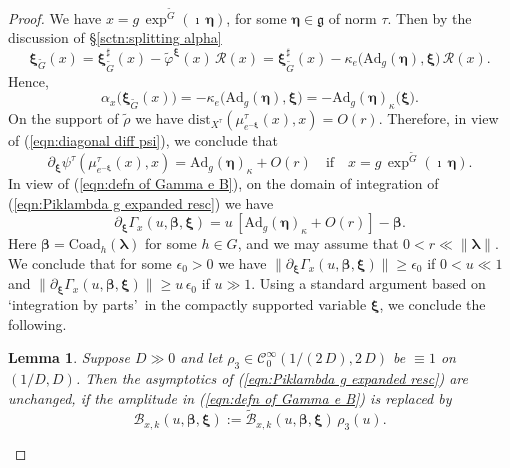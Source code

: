 \documentclass[12pt,a4paper]{article}
\theoremstyle{plain}
\newtheorem{lem}[thm]{Lemma}%
\theoremstyle{definition}
\begin{document}
\begin{proof}
We have $x=g\,\exp^{\tilde{G}}(\imath\,\boldsymbol{\eta})$,
for some $\boldsymbol{\eta}\in \mathfrak{g}$ of norm $\tau$.
Then by the discussion of \S \ref{sctn:splitting alpha} 
$$
\boldsymbol{\xi}_{\tilde{G}}(x)=\boldsymbol{\xi}_{\tilde{G}}^\sharp(x)
-\tilde{\varphi}^{\boldsymbol{\xi}}(x)\,\mathcal{R}(x)
=\boldsymbol{\xi}_{\tilde{G}}^\sharp(x)
-\kappa_e\big(\mathrm{Ad}_g(\boldsymbol{\eta}),\boldsymbol{\xi}\big)
\,\mathcal{R}(x).
$$
Hence,
$$
\alpha_x\big( \boldsymbol{\xi}_{\tilde{G}}(x)  \big)=
-\kappa_e\big(\mathrm{Ad}_g(\boldsymbol{\eta}),\boldsymbol{\xi}\big)
=-\mathrm{Ad}_g(\boldsymbol{\eta})_\kappa\big(\boldsymbol{\xi}\big).
$$
%
On the support of $\tilde{\rho}$ we have 
$\mathrm{dist}_{X^\tau}\left(\mu^\tau_{e^{-\boldsymbol{\xi}}}(x),x   \right)
=O(r)$.
Therefore, in view of (\ref{eqn:diagonal diff psi}), we conclude that 
%
\begin{equation}
\label{eqn:derivative xi psi}
\partial_{\boldsymbol{\xi}}\psi^\tau\left(\mu^\tau_{e^{-\boldsymbol{\xi}}}(x),x   \right)=\mathrm{Ad}_g(\boldsymbol{\eta})_\kappa+O(r)\quad
\text{if}\quad 
x=g\,\exp^{\tilde{G}}(\imath\,\boldsymbol{\eta}).
\end{equation}
%
In view of (\ref{eqn:defn of Gamma e B}), 
on the domain of integration
of (\ref{eqn:Piklambda g expanded resc}) we have 
\begin{equation}
\label{eqn:der xi Gammax}
\partial_{\boldsymbol{\xi}}\Gamma_x(u,\boldsymbol{\beta},\boldsymbol{\xi})=
u\,\left[\mathrm{Ad}_g(\boldsymbol{\eta})_\kappa+O(r)\right]-
\boldsymbol{\beta}.
\end{equation}
%
Here $\boldsymbol{\beta}=\mathrm{Coad}_h(\boldsymbol{\lambda})$ for some
$h\in G$, and we may assume that $0<r\ll \|\boldsymbol{\lambda}\|$.
We conclude that for some 
$\epsilon_0>0$ we have
$\|\partial_{\boldsymbol{\xi}}\Gamma_x(u,\boldsymbol{\beta},\boldsymbol{\xi})\|\ge \epsilon_0$ if $0<u\ll 1$
and $\|\partial_{\boldsymbol{\xi}}\Gamma_x(u,\boldsymbol{\beta},\boldsymbol{\xi})\|\ge u\,\epsilon_0$ if $u\gg 1$.
Using a standard  argument based on \lq integration by parts\rq\, 
in the compactly supported variable $\boldsymbol{\xi}$, we conclude the following.

\begin{lem}
\label{lem:compact supp u}
Suppose $D\gg 0$ and let $\rho_3\in \mathcal{C}^\infty_0(1/(2\,D),2\,D)$
be $\equiv 1$ on $(1/D,D)$. Then the asymptotics of
(\ref{eqn:Piklambda g expanded resc}) are unchanged, if 
the amplitude in (\ref{eqn:defn of Gamma e B}) is replaced by
$$\mathcal{B}_{x,k}(u,\boldsymbol{\beta},\boldsymbol{\xi}):=
\tilde{\mathcal{B}}_{x,k}(u,\boldsymbol{\beta},\boldsymbol{\xi})\,\rho_3(u)
.$$
%
\end{lem}


\end{proof}
\end{document}

